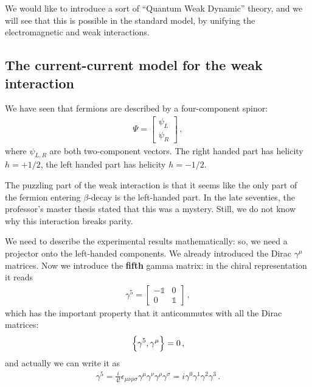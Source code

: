 \documentclass[main.tex]{subfiles}
\begin{document}

We would like to introduce a sort of ``Quantum Weak Dynamic'' theory, and we will see that this is possible in the standard model, by unifying the electromagnetic and weak interactions. 

\subsection{The current-current model for the weak interaction}

We have seen that fermions are described by a four-component spinor: 
%
\begin{subequations}
\begin{align}
\Psi = \left[\begin{array}{c}
\psi_{L} \\ 
\psi_{R}
\end{array}\right]
\,,
\end{align}
\end{subequations}
%
where \(\psi_{L, R}\) are both two-component vectors. The right handed part has helicity \(h = + 1/ 2\), the left handed part has helicity \(h = - 1 / 2\).

The puzzling part of the weak interaction is that it seems like the only part of the fermion entering \(\beta \)-decay is the left-handed part.
In the late seventies, the professor's master thesis stated that this was a mystery. Still, we do not know why this interaction breaks parity. 

We need to describe the experimental results mathematically: so, we need a projector onto the left-handed components. 
We already introduced the Dirac \(\gamma^{\mu }\) matrices. 
Now we introduce the \textbf{fifth} gamma matrix: in the chiral representation it reads
%
\begin{align}
\gamma^{5} = \left[\begin{array}{cc}
- \mathbb{1} & 0 \\ 
0 & \mathbb{1}
\end{array}\right]
\,,
\end{align}
%
which has the important property that it anticommutes with all the Dirac matrices: 
%
\begin{align}
\qty{\gamma^{5}, \gamma^{\mu }} = 0 
\,,
\end{align}
%
and actually we can write it as 
%
\begin{align}
\gamma^{5} = \frac{i}{4!} \epsilon_{\mu \nu \rho \sigma } \gamma^{\mu } \gamma^{\nu } \gamma^{\rho } \gamma^{\sigma } =  i \gamma^{0}\gamma^{1}\gamma^{2}\gamma^{3}
\,.
\end{align}
\end{document}
